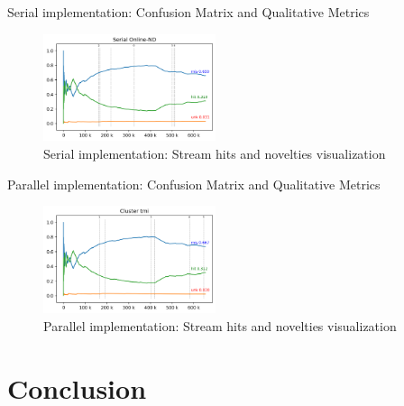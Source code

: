 \documentclass[conference]{IEEEtran}
\begin{document}
\begin{table}
    \caption{Serial implementation: Confusion Matrix and Qualitative Metrics}
    
    \label{fig:serial-matrix}
\end{table}
\begin{figure}[htbp]
  \centerline{\includegraphics[width=0.45\textwidth]{../experiments/online-nd.log.png}}
  \caption{Serial implementation: Stream hits and novelties visualization}
  \label{fig:serial-hits}
\end{figure}

\begin{table}
    \caption{Parallel implementation: Confusion Matrix and Qualitative Metrics}
    
    \label{fig:tmi-matrix}
\end{table}
\begin{figure}[htbp]
  \centerline{\includegraphics[width=0.45\textwidth]{../experiments/tmi-base.log.png}}
  \caption{Parallel implementation: Stream hits and novelties visualization}
  \label{fig:tmi-hits}
\end{figure}


\section{Conclusion}\label{sec:conclusion}

\end{document}
